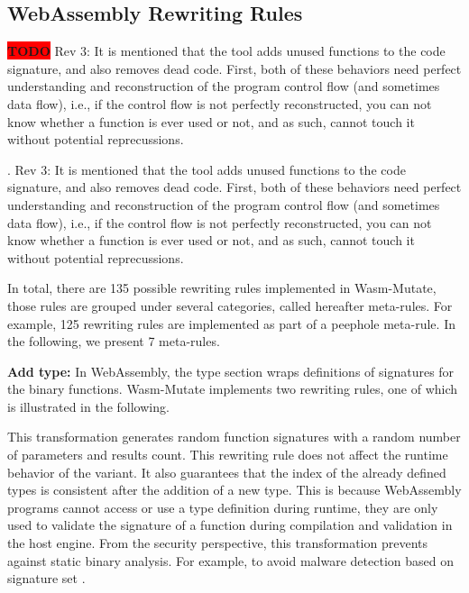 \documentclass[a4paper,fleqn]{cas-dc}
\newcommand*\badge[1]{ \colorbox{red}{\color{white}#1}}
\newcommand{\tool}{{\sc Wasm-Mutate}\xspace}
\newcommand{\todo}[1]{%
\refstepcounter{todo}
\noindent\textbf{\badge{TODO}} {\color{red}#1}
\addcontentsline{td}{todo}
{\color{red}\thesection.\thetodo\xspace #1}}
\begin{document}




\subsection{WebAssembly Rewriting Rules}

% 

\todo{Rev 3: It is mentioned that the tool adds unused functions to the code signature, and also removes dead code. First, both of these behaviors need perfect understanding and reconstruction of the program control flow (and sometimes data flow), i.e., if the control flow is not perfectly reconstructed, you can not know whether a function is ever used or not, and as such, cannot touch it without potential reprecussions.}

In total, there are 135 possible rewriting rules implemented in \tool, those rules are grouped under several categories, called hereafter meta-rules.
For example, 125 rewriting rules are implemented as part of a peephole meta-rule.
In the following, we present 7 meta-rules.

\textbf{Add type:}
In WebAssembly, the type section wraps definitions of signatures for the binary functions.
\tool implements two rewriting rules, one of which is illustrated in the following. 



This transformation generates random function signatures with a random number of parameters and results count.
This rewriting rule does not affect the runtime behavior of the  variant.
It also guarantees that the index of the already defined types is consistent after the addition of a new type. This is because WebAssembly programs cannot access or use a type definition during runtime, they are only used to validate the signature of a function during compilation and validation in the host engine.
From the security perspective, this transformation prevents against static binary analysis. 
For example, to avoid malware detection based on signature set \cite{CABRERAARTEAGA2023103296}.
\end{document}
